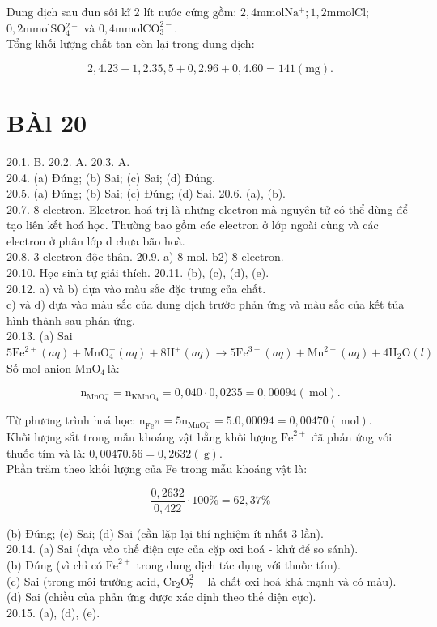 \documentclass[10pt]{article}
\begin{document}
Dung dịch sau đun sôi kĩ 2 lít nước cứng gồm: $2,4 \mathrm{mmol} \mathrm{Na}{ }^{+} ; 1,2 \mathrm{mmol} \mathrm{Cl}$; $0,2 \mathrm{mmol} \mathrm{SO}{ }_{4}^{2-}$ và $0,4 \mathrm{mmol} \mathrm{CO}_{3}^{2-}$.\\
Tổng khối lượng chất tan còn lại trong dung dịch:

$$
2,4.23+1,2.35,5+0,2.96+0,4.60=141(\mathrm{mg}) .
$$

\section*{BÀl 20}
20.1. B. 20.2. A. 20.3. A.\\
20.4. (a) Đúng; (b) Sai; (c) Sai; (d) Đúng.\\
20.5. (a) Đúng; (b) Sai; (c) Đúng; (d) Sai. 20.6. (a), (b).\\
20.7. 8 electron. Electron hoá trị là những electron mà nguyên tử có thể dùng để tạo liên kết hoá học. Thường bao gồm các electron ở lớp ngoài cùng và các electron ở phân lớp d chưa bão hoà.\\
20.8. 3 electron độc thân. 20.9. a) 8 mol. b2) 8 electron.\\
20.10. Học sinh tự giải thích. 20.11. (b), (c), (d), (e).\\
20.12. a) và b) dựa vào màu sắc đặc trưng của chất.\\
c) và d) dựa vào màu sắc của dung dịch trước phản ứng và màu sắc của kết tủa hình thành sau phản ứng.\\
20.13. (a) Sai\\
$5 \mathrm{Fe}^{2+}(a q)+\mathrm{MnO}_{4}^{-}(a q)+8 \mathrm{H}^{+}(a q) \rightarrow 5 \mathrm{Fe}^{3+}(a q)+\mathrm{Mn}^{2+}(a q)+4 \mathrm{H}_{2} \mathrm{O}(l)$\\
Số mol anion $\mathrm{MnO}_{4}^{-}$là:

$$
\mathrm{n}_{\mathrm{MnO}_{4}^{-}}=\mathrm{n}_{\mathrm{KMnO}_{4}}=0,040 \cdot 0,0235=0,00094(\mathrm{~mol}) .
$$

Từ phương trình hoá học: $\mathrm{n}_{\mathrm{Fe}^{21}}=5 \mathrm{n}_{\mathrm{MnO}_{4}^{-}}=5.0,00094=0,00470(\mathrm{~mol})$.\\
Khối lượng sắt trong mẫu khoáng vật bằng khối lượng $\mathrm{Fe}^{2+}$ đã phản ứng với thuốc tím và là: $0,00470.56=0,2632(\mathrm{~g})$.\\
Phần trăm theo khối lượng của Fe trong mẫu khoáng vật là:

$$
\frac{0,2632}{0,422} \cdot 100 \%=62,37 \%
$$

(b) Đúng; (c) Sai; (d) Sai (cần lặp lại thí nghiệm ít nhất 3 lần).\\
20.14. (a) Sai (dựa vào thế điện cực của cặp oxi hoá - khử để so sánh).\\
(b) Đúng (vì chỉ có $\mathrm{Fe}^{2+}$ trong dung dịch tác dụng với thuốc tím).\\
(c) Sai (trong môi trường acid, $\mathrm{Cr}_{2} \mathrm{O}_{7}^{2-}$ là chất oxi hoá khá mạnh và có màu).\\
(d) Sai (chiều của phản ứng được xác định theo thế điện cực).\\
20.15. (a), (d), (e).
\end{document}
